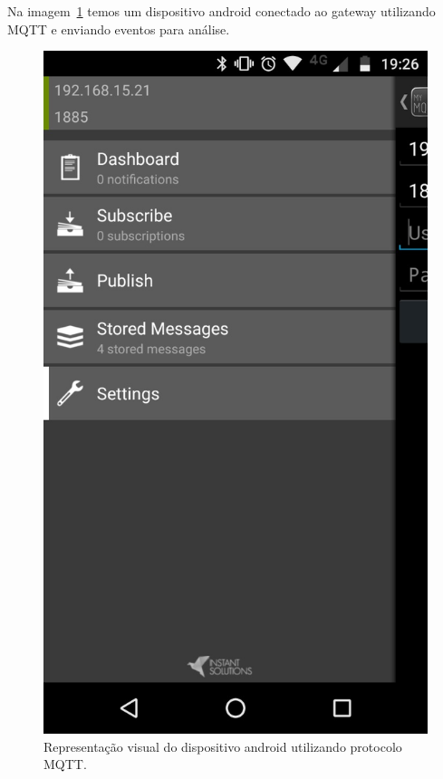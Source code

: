 Na imagem~\ref{fig:aplicativoAndroidMQTT} temos um dispositivo android conectado ao gateway utilizando MQTT e enviando eventos para análise.
\begin{figure}[h!]
	\begin{center}
		\includegraphics[width=1.085\textwidth]{./img/aplicativoAndroidMQTT}
		\caption{Representação visual do dispositivo android utilizando protocolo MQTT.}
		\label{fig:aplicativoAndroidMQTT}
	\end{center}
\end{figure}

